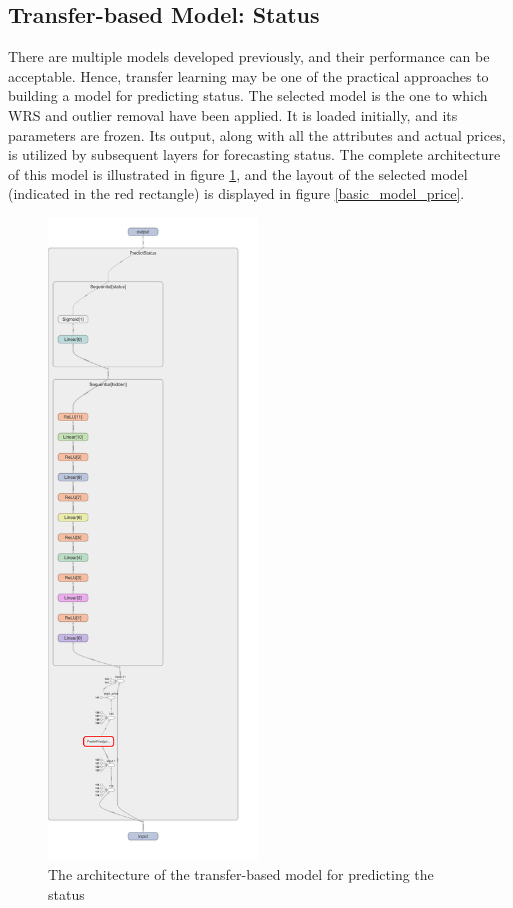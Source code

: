 \documentclass[12pt,twoside]{report}
\begin{document}
\subsection{Transfer-based Model: Status}
There are multiple models developed previously, and their performance can be acceptable. Hence, transfer learning may be one of the practical approaches to building a model for predicting status. The selected model is the one to which WRS and outlier removal have been applied. It is loaded initially, and its parameters are frozen. Its output, along with all the attributes and actual prices, is utilized by subsequent layers for forecasting status. The complete architecture of this model is illustrated in figure \ref{transfer_layout}, and the layout of the selected model (indicated in the red rectangle) is displayed in figure \ref{basic_model_price}.

\begin{figure}[!htbp]
	\centering
	\includegraphics[height=17cm]{transfer_layout}
	\caption{The architecture of the transfer-based model for predicting the status}
	\label{transfer_layout}
\end{figure}
\end{document}
